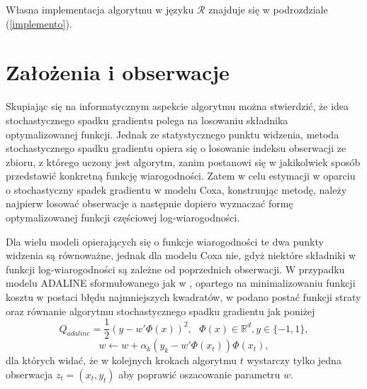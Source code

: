 Własna implementacja algorytmu w języku $\mathcal{R}$ znajduje się w podrozdziale (\ref{implemento}).

\section{Założenia i obserwacje}\label{zalozenia}

Skupiając się na informatycznym aspekcie algorytmu można stwierdzić, że idea stochastycznego spadku gradientu polega na losowaniu składnika optymalizowanej funkcji. Jednak ze statystycznego punktu widzenia, metoda stochastycznego spadku gradientu opiera się o losowanie indeksu obserwacji ze zbioru, z którego uczony jest algorytm, zanim postanowi się w jakikolwiek sposób przedstawić konkretną funkcję wiarogodności. Zatem w celu estymacji w oparciu o stochastyczny spadek gradientu w modelu Coxa, konstruując metodę, należy najpierw losować obserwacje a następnie dopiero wyznaczać formę optymalizowanej funkcji częściowej log-wiarogodności. 

Dla wielu modeli opierających się o funkcje wiarogodności te dwa punkty widzenia są równoważne, jednak dla modelu Coxa nie, gdyż niektóre składniki w funkcji log-wiarogodności są zależne od poprzednich obserwacji. W przypadku modelu ADALINE sformułowanego jak w \cite{ADALINE2}, opartego na minimalizowaniu funkcji kosztu w postaci błędu najmniejszych kwadratów, w \cite{bott2} podano postać funkcji straty oraz równanie algorytmu stochastycznego spadku gradientu jak poniżej
$$Q_{adaline} = \frac{1}{2}(y-w'\varPhi(x))^2, \ \ \ \varPhi(x) \in \mathbb{R}^d, y \in \{-1,1\},$$ 
$$w \leftarrow w + \alpha_k(y_k-w'\varPhi(x_t))\varPhi(x_t),$$
dla których widać, że w kolejnych krokach algorytmu $t$ wystarczy tylko jedna obserwacja $z_t=(x_t,y_t)$ aby poprawić oszacowanie parametru $w$.

